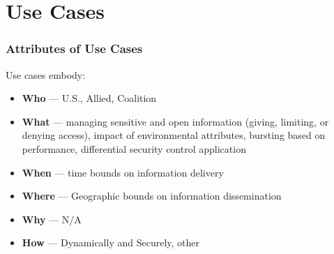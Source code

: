 \documentclass[t,handout]{beamer}
\begin{document}

\section{Use Cases}

\begin{frame}
\frametitle{Attributes of Use Cases}
Use cases embody:
\begin{itemize}
\item {\bf Who} --- U.S., Allied, Coalition
\item {\bf What} --- managing sensitive and open information (giving, limiting, or denying access), impact of environmental attributes, bursting based on performance, differential security control application
\item {\bf When} --- time bounds on information delivery
\item {\bf Where} --- Geographic bounds on information dissemination
\item {\bf Why} --- N/A
\item {\bf How} --- Dynamically and Securely, other
\end{itemize}
\end{frame}
\end{document}
